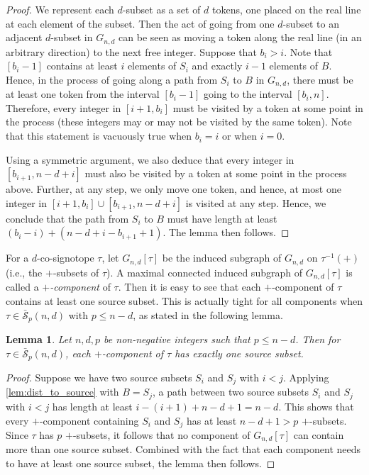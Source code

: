 \documentclass[a4paper,11pt]{amsart}
\newtheorem{lemma}[theorem]{Lemma}
\newcommand{\calS}{\mathcal{S}}
\newcommand{\defi}[1]{\textcolor{defblue}{\emph{#1}}}
\begin{document}
\begin{proof}
    We represent each $d$-subset as a set of $d$ tokens, one placed on the real line at each element of the subset.
    Then the act of going from one $d$-subset to an adjacent $d$-subset in $G_{n,d}$ can be seen as moving a token along the real line (in an arbitrary direction) to the next free integer. 
	Suppose that $b_i > i$.
	Note that $[b_i-1]$ contains at least $i$ elements of $S_i$ and exactly $i-1$ elements of $B$.
	Hence, in the process of going along a path from $S_i$ to $B$ in $G_{n,d}$, there must be at least one token from the interval $[b_i-1]$ going to the interval $[b_i,n]$. 
	Therefore, every integer in $[i+1,b_i]$ must be visited by a token at some point in the process (these integers may or may not be visited by the same token).
	Note that this statement is vacuously true when $b_i = i$ or when $i=0$.
	
	Using a symmetric argument, we also deduce that every integer in $[b_{i+1},n-d+i]$ must also be visited by a token at some point in the process above.
	Further, at any step, we only move one token, and hence, at most one integer in $[i+1,b_i] \cup [b_{i+1},n-d+i]$ is visited at any step.
	Hence, we conclude that the path from $S_i$ to $B$ must have length at least $(b_i-i) + (n-d+i-b_{i+1}+1)$.
	The lemma then follows.
\end{proof}

For a $d$-co-signotope $\tau$, let $G_{n,d}[\tau]$ be the induced subgraph of $G_{n,d}$ on $\tau^{-1}(+)$ (i.e., the $+$-subsets of $\tau$).
A maximal connected induced subgraph of $G_{n,d}[\tau]$ is called a \defi{$+$-component} of $\tau$.
Then it is easy to see that each $+$-component of $\tau$ contains at least one source subset.
This is actually tight for all components when $\tau \in \bar{\calS}_p(n,d)$ with $p  \leq n-d$, as stated in the following lemma.

\begin{lemma}
\label{lem:exact_one_source}
    Let $n,d,p$ be non-negative integers such that $p \leq n-d$.
    Then for $\tau \in \bar{\calS}_p(n,d)$, each $+$-component of $\tau$ has exactly one source subset.
\end{lemma}
\begin{proof}
    Suppose we have two source subsets $S_i$ and $S_j$ with $i<j$. 
    Applying \cref{lem:dist_to_source} with $B = S_j$, a path between two source subsets $S_i$ and $S_j$ with $i<j$ has length at least $i - (i+1) + n - d +1 = n-d$. This shows that every $+$-component containing $S_i$ and $S_j$ has at least $n-d+1 > p$ $+$-subsets. 
    Since $\tau$ has $p$ $+$-subsets, it follows that no component of $G_{n,d}[\tau]$ can contain more than one source subset.
    Combined with the fact that each component needs to have at least one source subset, the lemma then follows.
\end{proof}
\end{document}
